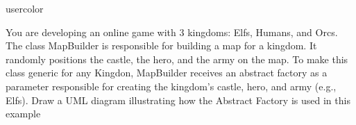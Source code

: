 \begin{chatquest}{usercolor}{}

You are developing an online game with 3 kingdoms: Elfs, Humans, and Orcs. The class MapBuilder is responsible for building a map for a kingdom. It randomly positions the castle, the hero, and the army on the map. To make this class generic for any Kingdon, MapBuilder receives an abstract factory as a parameter responsible for creating the kingdom's castle, hero, and army (e.g., Elfs). 
Draw a UML diagram illustrating how the Abstract Factory is used in this example

\end{chatquest}

